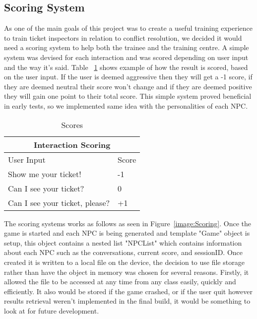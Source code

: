 \newpage

\subsection{Scoring System}
As one of the main goals of this project was to create a useful training experience to train ticket inspectors in relation to conflict resolution, we decided it would need a scoring system to help both the trainee and the training centre. A simple system was devised for each interaction and was scored depending on user input and the way it's said. Table ~\ref{tab:scores} shows example of how the result is scored, based on the user input. If the user is deemed aggressive then they will get a -1 score, if they are deemed neutral their score won't change and if they are deemed positive they will gain one point to their total score. This simple system proved beneficial in early tests, so we implemented same idea with the personalities of each NPC.

\begin{table}[!ht]
    \centering
    
    \caption{Scores}
    \label{tab:scores}
\begin{tabular}{ |p{6cm}|p{2cm}|  }
\hline
\multicolumn{2}{|c|}{Interaction Scoring} \\
\hline
User Input & Score \\
\hline
Show me your ticket! & -1 \\
\hline
Can I see your ticket? & 0 \\
\hline
Can I see your ticket, please? & +1 \\
\hline

\end{tabular}
\end{table}

\newpage

The scoring systems works as follows as seen in Figure~\ref{image:Scoring}. Once the game is started and each NPC is being generated and template "Game" object is setup, this object contains a nested list "NPCList" which contains information about each NPC such as the conversations, current score, and sessionID. Once created it is written to a local file on the device, the decision to use file storage rather than have the object in memory was chosen for several reasons. Firstly, it allowed the file to be accessed at any time from any class easily, quickly and efficiently. It also would be stored if the game crashed, or if the user quit however results retrieval weren't implemented in the final build, it would be something to look at for future development.

